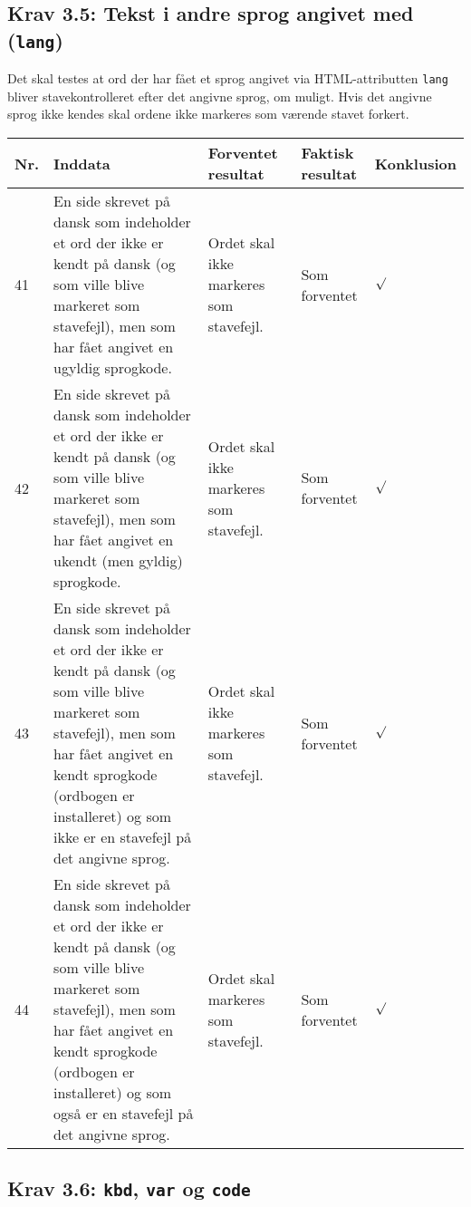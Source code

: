\documentclass[a4paper,oneside,article]{memoir}
\begin{document}
\begin{landscape}
\begin{longtable}[c]{p{20pt}|p{220pt}|p{130pt}|p{130pt}|p{50pt}}
\end{longtable}

\subsection{Krav 3.5: Tekst i andre sprog angivet med
  (\texttt{lang})}

Det skal testes at ord der har fået et sprog angivet via
HTML-attributten \texttt{lang} bliver stavekontrolleret efter det
angivne sprog, om muligt. Hvis det angivne sprog ikke kendes skal
ordene ikke markeres som værende stavet forkert.

\begin{longtable}[c]{p{20pt}|p{220pt}|p{130pt}|p{130pt}|p{50pt}}
\textbf{Nr.} &
\textbf{Inddata} &
\textbf{Forventet resultat} &
\textbf{Faktisk resultat} &
\textbf{Konklusion} \\ \hline

41 &
En side skrevet på dansk som indeholder et ord der ikke er kendt på
dansk (og som ville blive markeret som stavefejl), men som har fået
angivet en ugyldig sprogkode. &
Ordet skal ikke markeres som stavefejl. &
Som forventet &
$\surd$ \\ \hline

42 &
En side skrevet på dansk som indeholder et ord der ikke er kendt på
dansk (og som ville blive markeret som stavefejl), men som har fået
angivet en ukendt (men gyldig) sprogkode. &
Ordet skal ikke markeres som stavefejl. &
Som forventet &
$\surd$ \\ \hline

43 &
En side skrevet på dansk som indeholder et ord der ikke er kendt på
dansk (og som ville blive markeret som stavefejl), men som har fået
angivet en kendt sprogkode (ordbogen er installeret) og som ikke er en
stavefejl på det angivne sprog. &
Ordet skal ikke markeres som stavefejl. &
Som forventet &
$\surd$ \\ \hline

44 &
En side skrevet på dansk som indeholder et ord der ikke er kendt på
dansk (og som ville blive markeret som stavefejl), men som har fået
angivet en kendt sprogkode (ordbogen er installeret) og som også er en
stavefejl på det angivne sprog. &
Ordet skal markeres som stavefejl. &
Som forventet &
$\surd$ \\ \hline

\end{longtable}

\subsection{Krav 3.6: \texttt{kbd}, \texttt{var} og \texttt{code}}


\end{landscape}
\end{document}

